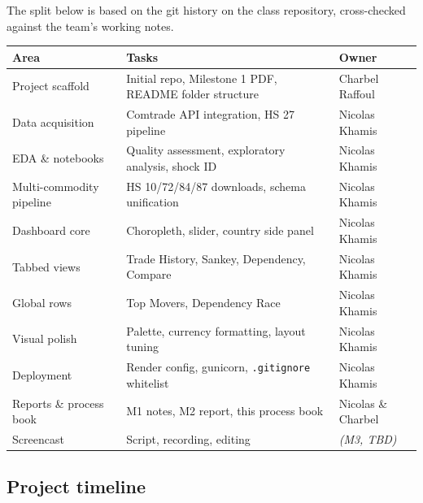 \documentclass[a4paper,10pt]{article}
\begin{document}
The split below is based on the git history on the class repository,
cross-checked against the team's working notes.

\begin{table}[H]
\centering\small
\begin{tabular}{@{}p{4.3cm}p{8cm}p{3cm}@{}}
\toprule
\textbf{Area} & \textbf{Tasks} & \textbf{Owner} \\
\midrule
Project scaffold & Initial repo, Milestone 1 PDF, README folder structure & Charbel Raffoul \\
Data acquisition & Comtrade API integration, HS 27 pipeline & Nicolas Khamis \\
EDA \& notebooks & Quality assessment, exploratory analysis, shock ID & Nicolas Khamis \\
Multi-commodity pipeline & HS 10/72/84/87 downloads, schema unification & Nicolas Khamis \\
Dashboard core & Choropleth, slider, country side panel & Nicolas Khamis \\
Tabbed views & Trade History, Sankey, Dependency, Compare & Nicolas Khamis \\
Global rows & Top Movers, Dependency Race & Nicolas Khamis \\
Visual polish & Palette, currency formatting, layout tuning & Nicolas Khamis \\
Deployment & Render config, gunicorn, \texttt{.gitignore} whitelist & Nicolas Khamis \\
Reports \& process book & M1 notes, M2 report, this process book & Nicolas \& Charbel \\
Screencast & Script, recording, editing & {\color{muted}\itshape (M3, TBD)} \\
\bottomrule
\end{tabular}
\end{table}

\subsection{Project timeline}
\end{document}

